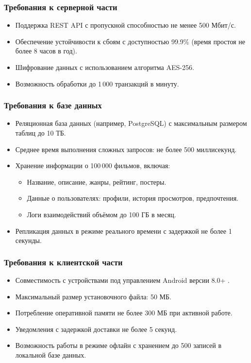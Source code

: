 \subsubsection*{Требования к серверной части}
\begin{itemize}
	\item Поддержка REST API с пропускной способностью не менее 500 Мбит/с.
	\item Обеспечение устойчивости к сбоям с доступностью 99.9\% (время простоя не более 8 часов в год).
	\item Шифрование данных с использованием алгоритма AES-256.
	\item Возможность обработки до 1\,000 транзакций в минуту.
\end{itemize}

\subsubsection*{Требования к базе данных}
\begin{itemize}
	\item Реляционная база данных (например, PostgreSQL) с максимальным размером таблиц до 10 ТБ.
	\item Среднее время выполнения сложных запросов: не более 500 миллисекунд.
	\item Хранение информации о 100\,000 фильмов, включая:
	\begin{itemize}
		\item Название, описание, жанры, рейтинг, постеры.
		\item Данные о пользователях: профили, история просмотров, предпочтения.
		\item Логи взаимодействий объёмом до 100 ГБ в месяц.
	\end{itemize}
	\item Репликация данных в режиме реального времени с задержкой не более 1 секунды.
\end{itemize}

\subsubsection*{Требования к клиентской части}
\begin{itemize}
	\item Совместимость с устройствами под управлением Android версии 8.0+ .
	\item Максимальный размер установочного файла: 50 МБ.
	\item Потребление оперативной памяти не более 300 МБ при активной работе.
	\item Уведомления с задержкой доставки не более 5 секунд.
	\item Возможность работы в режиме офлайн с хранением до 500 записей в локальной базе данных.
\end{itemize}

